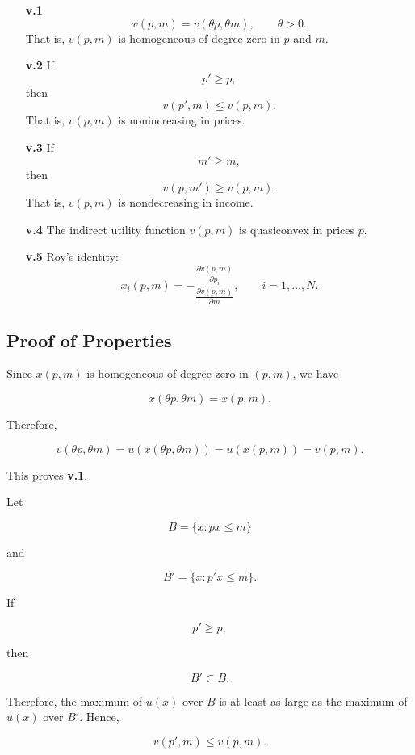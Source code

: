 \begin{enumerate}
    \item[\textbf{v.1}] 
    \[
    v(p,m)=v(\theta p,\theta m),
    \qquad \theta>0.
    \]
    That is, \(v(p,m)\) is homogeneous of degree zero in \(p\) and \(m\).

    \item[\textbf{v.2}]
    If
    \[
    p' \ge p,
    \]
    then
    \[
    v(p',m) \le v(p,m).
    \]
    That is, \(v(p,m)\) is nonincreasing in prices.

    \item[\textbf{v.3}]
    If
    \[
    m' \ge m,
    \]
    then
    \[
    v(p,m') \ge v(p,m).
    \]
    That is, \(v(p,m)\) is nondecreasing in income.

    \item[\textbf{v.4}]
    The indirect utility function \(v(p,m)\) is quasiconvex in prices \(p\).

    \item[\textbf{v.5}]
    Roy's identity:
    \[
    x_i(p,m)
    =
    -
    \frac{\frac{\partial v(p,m)}{\partial p_i}}
    {\frac{\partial v(p,m)}{\partial m}},
    \qquad
    i=1,\dots,N.
    \]
\end{enumerate}

\subsection{Proof of Properties}

Since \(x(p,m)\) is homogeneous of degree zero in \((p,m)\), we have

\[
x(\theta p,\theta m)=x(p,m).
\]

Therefore,

\[
v(\theta p,\theta m)
=
u(x(\theta p,\theta m))
=
u(x(p,m))
=
v(p,m).
\]

This proves \textbf{v.1}.

\medskip

Let

\[
B=\{x:px\le m\}
\]

and

\[
B'=\{x:p'x\le m\}.
\]

If

\[
p'\ge p,
\]

then

\[
B'\subset B.
\]

Therefore, the maximum of \(u(x)\) over \(B\) is at least as large as the maximum of \(u(x)\) over \(B'\). Hence,

\[
v(p',m)\le v(p,m).
\]

